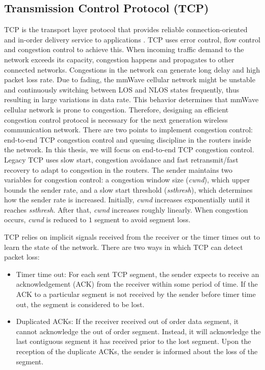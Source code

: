 \subsection{Transmission Control Protocol (TCP)}
\label{subsec:3}
\par TCP is the transport layer protocol that provides reliable connection-oriented and in-order delivery service to applications \cite{panwar2004tcp}. TCP uses error control, flow control and congestion control to achieve this. When incoming traffic demand to the network exceeds its capacity, congestion happens and propagates to other connected networks. Congestions in the network can generate long delay and high packet loss rate. Due to fading, the mmWave cellular network might be unstable and continuously switching between LOS and NLOS states frequently, thus resulting in large variations in data rate. This behavior determines that mmWave cellular network is prone to congestion. Therefore, designing an efficient congestion control protocol is necessary for the next generation wireless communication network. There are two points to implement congestion control: end-to-end TCP congestion control and queuing discipline in the routers inside the network. In this thesis, we will focus on end-to-end TCP congestion control. Legacy TCP uses slow start, congestion avoidance and fast retransmit/fast recovery to adapt to congestion in the routers. The sender maintains two variables for congestion control: a congestion window size (\emph{cwnd}), which upper bounds the sender rate, and a slow start threshold (\emph{ssthresh}), which determines how the sender rate is increased. Initially, \emph{cwnd} increases exponentially until it reaches \emph{ssthresh}. After that, \emph{cwnd} increases roughly linearly. When congestion occurs, \emph{cwnd} is reduced to $1$ segment to avoid segment loss. 
\par TCP relies on implicit signals received from the receiver or the timer times out to learn the state of the network. There are two ways in which TCP can detect packet loss: 
\begin{itemize}
\item Timer time out: For each sent TCP segment, the sender expects to receive an acknowledgement (ACK) from the receiver within some period of time. If the ACK to a particular segment is not received by the sender before timer time out, the segment is considered to be lost. 
\item Duplicated ACKs: If the receiver received out of order data segment, it cannot acknowledge the out of order segment. Instead, it will acknowledge the last contiguous segment it has received prior to the lost segment. Upon the reception of the duplicate ACKs, the sender is informed about the loss of the segment.
\end{itemize}
